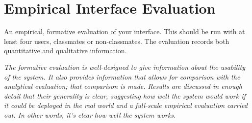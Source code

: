 \documentclass[conference]{IEEEtran}
\begin{document}
\section{Empirical Interface Evaluation}
An empirical, formative evaluation of your interface. This should be run with at least four users, classmates or non-classmates. The evaluation records both quantitative and qualitative information. 

\emph{The formative evaluation is well-designed to give information about the usability of the system. It also provides information that allows for comparison with the analytical evaluation; that comparison is made. Results are discussed in enough detail that their generality is clear, suggesting how well the system would work if it could be deployed in the real world and a full-scale empirical evaluation carried out. In other words, it's clear how well the system works.}


%
%

\end{document}
